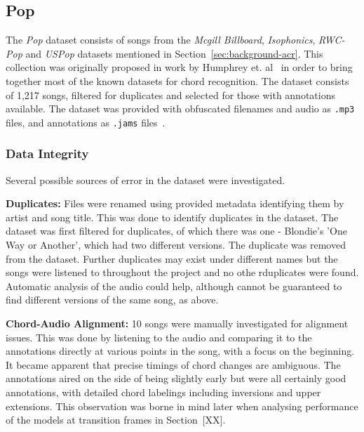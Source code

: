 \subsection{Pop}

The \emph{Pop} dataset consists of songs from the \emph{Mcgill Billboard}, \emph{Isophonics}, \emph{RWC-Pop} and \emph{USPop} datasets mentioned in Section~\ref{sec:background-acr}. This collection was originally proposed in work by Humphrey et. al~\cite{FourTimelyInsights} in order to bring together most of the known datasets for chord recognition. The dataset consists of 1,217 songs, filtered for duplicates and selected for those with annotations available. The dataset was provided with obfuscated filenames and audio as \texttt{.mp3} files, and annotations as \texttt{.jams} files~\citep{JAMS}. 

\subsubsection{Data Integrity}

Several possible sources of error in the dataset were investigated.

\textbf{Duplicates:} Files were renamed using provided metadata identifying them by artist and song title. This was done to identify duplicates in the dataset. The dataset was first filtered for duplicates, of which there was one - Blondie's 'One Way or Another', which had two different versions. The duplicate was removed from the dataset. Further duplicates may exist under different names but the songs were listened to throughout the project and no othe rduplicates were found. Automatic analysis of the audio could help, although cannot be guaranteed to find different versions of the same song, as above.

\textbf{Chord-Audio Alignment:} 10 songs were manually investigated for alignment issues. This was done by listening to the audio and comparing it to the annotations directly at various points in the song, with a focus on the beginning. It became apparent that precise timings of chord changes are ambiguous. The annotations aired on the side of being slightly early but were all certainly good annotations, with detailed chord labelings including inversions and upper extensions. This observation was borne in mind later when analysing performance of the models at transition frames in Section~[XX].

